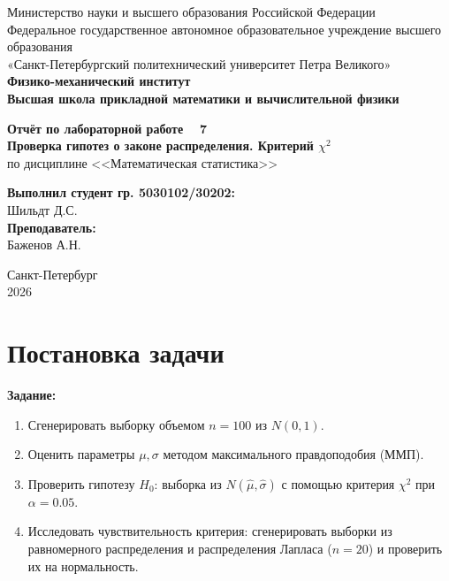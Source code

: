 \documentclass[a4paper, 14pt]{extarticle}
\begin{document}
\begin{titlepage}
    \begin{center}
        Министерство науки и высшего образования Российской Федерации\\
        Федеральное государственное автономное образовательное учреждение высшего образования\\
        «Санкт-Петербургский политехнический университет Петра Великого»\\
        
        \textbf{Физико-механический институт}\\
        \textbf{Высшая школа прикладной математики и вычислительной физики}
    \end{center}

    \vfill
    
    \begin{center}
        \textbf{Отчёт по лабораторной работе \textnumero~ 7\\[0.5cm]}
        \textbf{Проверка гипотез о законе распределения. Критерий $\chi^2$\\}
        по дисциплине <<Математическая статистика>>
    \end{center}

    \vfill

    \hfill
    \begin{minipage}{0.45\textwidth}
        \textbf{Выполнил студент гр. 5030102/30202:}\\
        Шильдт Д.С.\\[0.5cm]
        \textbf{Преподаватель:}\\ 
        Баженов А.Н.
    \end{minipage}

    \vfill

    \begin{center}
        Санкт-Петербург\\2026
    \end{center}
\end{titlepage}

\setcounter{page}{2}

\tableofcontents
\newpage

\section{Постановка задачи}

\textbf{Задание:}
\begin{enumerate}
    \item Сгенерировать выборку объемом $n=100$ из $N(0,1)$.
    \item Оценить параметры $\mu,\sigma$ методом максимального правдоподобия (ММП). 
    \item Проверить гипотезу $H_0$: выборка из $N(\widehat{\mu},\widehat{\sigma})$ с помощью критерия $\chi^2$ при $\alpha=0.05$. 
    \item Исследовать чувствительность критерия: сгенерировать выборки из равномерного распределения и распределения Лапласа ($n=20$) и проверить их на нормальность.
\end{enumerate}
\end{document}
